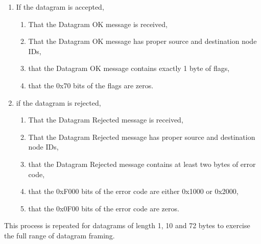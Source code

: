 \begin{enumerate}
\item If the datagram is accepted,
    \begin{enumerate}
    \item That the Datagram OK message is received,
    \item That the Datagram OK message has proper source and destination node IDs, 
    \item that the Datagram OK message contains exactly 1 byte of flags,
    \item that the 0x70 bits of the flags are zeros.
    \end{enumerate}
\item if the datagram is rejected, 
    \begin{enumerate}
    \item That the Datagram Rejected message is received,
    \item That the Datagram Rejected message has proper source and destination node IDs, 
    \item that the Datagram Rejected message contains at least two bytes of error code,
    \item that the 0xF000 bits of the error code are either 0x1000 or 0x2000,
    \item that the 0x0F00 bits of the error code are zeros.
    \end{enumerate}
\end{enumerate}

This process is repeated for datagrams of length 1, 10 and 72 bytes to exercise the full
range of datagram framing.


  
